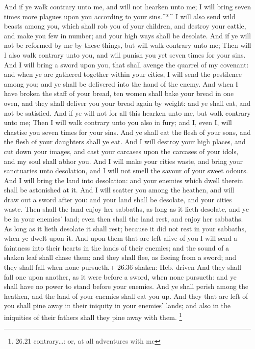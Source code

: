  And if ye walk contrary unto me, and will not hearken unto
me; I will bring seven times more plagues upon you according to your
sins.\^{}*\^{}  I will also send wild beasts among you,
which shall rob you of your children, and destroy your cattle, and make
you few in number; and your high ways shall be desolate. 
And if ye will not be reformed by me by these things, but will walk
contrary unto me;  Then will I also walk contrary unto you,
and will punish you yet seven times for your sins.  And I
will bring a sword upon you, that shall avenge the quarrel of my
covenant: and when ye are gathered together within your cities, I will
send the pestilence among you; and ye shall be delivered into the hand
of the enemy.  And when I have broken the staff of your
bread, ten women shall bake your bread in one oven, and they shall
deliver you your bread again by weight: and ye shall eat, and not be
satisfied.  And if ye will not for all this hearken unto
me, but walk contrary unto me;  Then I will walk contrary
unto you also in fury; and I, even I, will chastise you seven times for
your sins.  And ye shall eat the flesh of your sons, and
the flesh of your daughters shall ye eat.  And I will
destroy your high places, and cut down your images, and cast your
carcases upon the carcases of your idols, and my soul shall abhor you.
 And I will make your cities waste, and bring your
sanctuaries unto desolation, and I will not smell the savour of your
sweet odours.  And I will bring the land into desolation:
and your enemies which dwell therein shall be astonished at it.
 And I will scatter you among the heathen, and will draw
out a sword after you: and your land shall be desolate, and your cities
waste.  Then shall the land enjoy her sabbaths, as long as
it lieth desolate, and ye be in your enemies' land; even then shall the
land rest, and enjoy her sabbaths.  As long as it lieth
desolate it shall rest; because it did not rest in your sabbaths, when
ye dwelt upon it.  And upon them that are left alive of you
I will send a faintness into their hearts in the lands of their enemies;
and the sound of a shaken leaf shall chase them; and they shall flee, as
fleeing from a sword; and they shall fall when none pursueth.+ 26.36
shaken: Heb. driven  And they shall fall one upon another,
as it were before a sword, when none pursueth: and ye shall have no
power to stand before your enemies.  And ye shall perish
among the heathen, and the land of your enemies shall eat you up.
 And they that are left of you shall pine away in their
iniquity in your enemies' lands; and also in the iniquities of their
fathers shall they pine away with them. \footnote{26.21 contrary\ldots:
  or, at all adventures with me}


